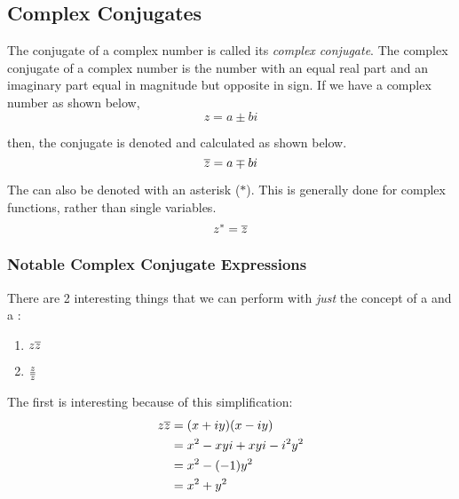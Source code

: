 \subsection{Complex Conjugates}\label{app:Complex_Conjugates}
\begin{definition}\label{def:Complex_Conjugate}
  The conjugate of a complex number is called its \emph{complex conjugate}.
  The complex conjugate of a complex number is the number with an equal real part and an imaginary part equal in magnitude but opposite in sign.
  If we have a complex number as shown below,
  \begin{equation*}
    z = a \pm bi
  \end{equation*}

  then, the conjugate is denoted and calculated as shown below.
  \begin{equation}\label{eq:Complex_Conjugates}
    \overline{z} = a \mp bi
  \end{equation}
\end{definition}

The  can also be denoted with an asterisk ($*$).
This is generally done for complex functions, rather than single variables.
\begin{equation}\label{eq:Complex_Conjugates_Asterisk}
  z^{*} = \overline{z}
\end{equation}

\subsubsection{Notable Complex Conjugate Expressions}\label{subsubsec:Complex_Conjugate_Notable_Expressions}
There are 2 interesting things that we can perform with \textit{just} the concept of a  and a :
\begin{enumerate}
\item $z \overline{z}$
\item $\frac{z}{\overline{z}}$
\end{enumerate}

The first is interesting because of this simplification:
\begin{align*}
  z \overline{z} &= (x + iy) (x - iy) \\
                 &= x^{2} - xyi + xyi - i^{2} y^{2} \\
                 &= x^{2} - (-1) y^{2} \\
                 &= x^{2} + y^{2}
\end{align*}

